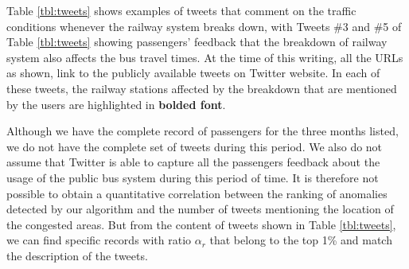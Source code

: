 \documentclass[conference]{IEEEtran.1.8}
\begin{document}

Table \ref{tbl:tweets} shows examples of tweets that comment on the traffic conditions whenever the railway system breaks down, with Tweets \#3 and \#5 of Table \ref{tbl:tweets} showing passengers' feedback that the breakdown of railway system also affects the bus travel times. At the time of this writing, all the URLs as shown, link to the publicly available tweets on Twitter website. In each of these tweets, the railway stations affected by the breakdown that are mentioned by the users are highlighted in \textbf{bolded font}.

Although we have the complete record of passengers for the three months listed, we do not have the complete set of tweets during this period. We also do not assume that Twitter is able to capture all the passengers feedback about the usage of the public bus system during this period of time. It is therefore not possible to obtain a quantitative correlation between the ranking of anomalies detected by our algorithm and the number of tweets mentioning the location of the congested areas. But from the content of tweets shown in Table \ref{tbl:tweets}, we can find specific records with ratio $\alpha_r$ that belong to the top 1\% and match the description of the tweets.
\end{document}
